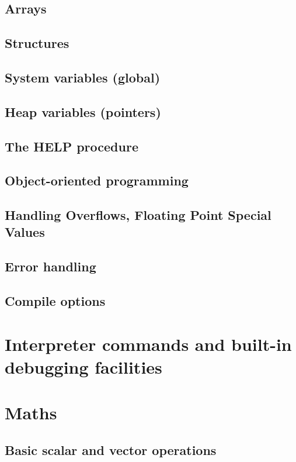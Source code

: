 \documentclass[10pt,titleauthor,openany]{mwbk}
\begin{document}
  \section{Arrays}
  
  \section{Structures}
  \section{System variables (global)}
  \section{Heap variables (pointers)}
  \section{The HELP procedure}
  \section{Object-oriented programming}
  
  \section{Handling Overflows, Floating Point Special Values}
  \section{Error handling}
  
  \section{Compile options}
  
  \chapter{Interpreter commands and built-in debugging facilities}
  

  \chapter{Maths}

  \section{Basic scalar and vector operations}
  
\end{document}
